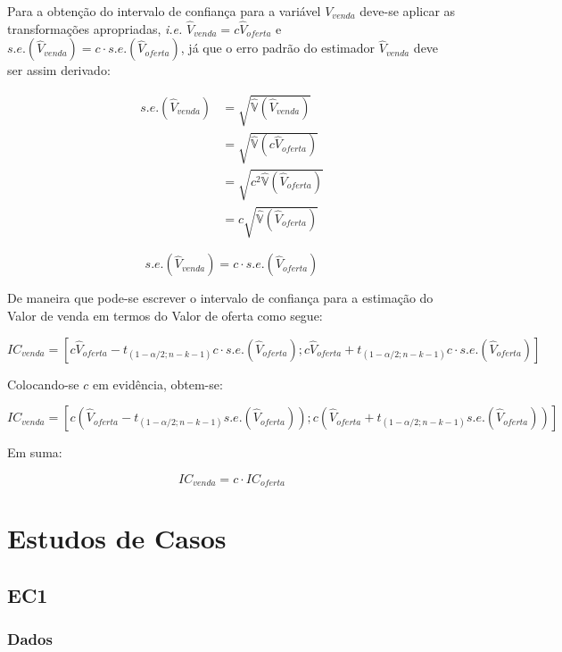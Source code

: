 \documentclass{article}
\begin{document}
Para a obtenção do intervalo de confiança para a variável \(V_{venda}\)
deve-se aplicar as transformações apropriadas, \emph{i.e.}
\(\hat V_{venda} = c \hat V_{oferta}\) e
\(s.e.(\hat V_{venda}) = c \cdot s.e.(\hat V_{oferta})\), já que o erro
padrão do estimador \(\hat V_{venda}\) deve ser assim derivado:

\begin{align*}
s.e.(\hat V_{venda}) &= \sqrt{\hat{\mathbb{V}}(\hat V_{venda})}\\
&= \sqrt{\hat{\mathbb{V}}(c \hat V_{oferta})} \\
&= \sqrt{c^2 \hat{\mathbb{V}}(\hat V_{oferta})}\\
&= c \sqrt{\hat{\mathbb{V}}(\hat V_{oferta})}
\end{align*}

\begin{equation}
\label{eq:SEVenda}
s.e.(\hat V_{venda}) = c \cdot s.e.(\hat V_{oferta})
\end{equation}

De maneira que pode-se escrever o intervalo de confiança para a
estimação do Valor de venda em termos do Valor de oferta como segue:

\[IC_{venda} = [c \hat V_{oferta} - t_{(1-\alpha/2; n-k-1)} c \cdot s.e.(\hat V_{oferta}); 
   c \hat V_{oferta} + t_{(1-\alpha/2; n-k-1)} c \cdot s.e.(\hat V_{oferta})]\]

Colocando-se \(c\) em evidência, obtem-se:

\[IC_{venda} = [c(\hat V_{oferta} - t_{(1-\alpha/2; n-k-1)} s.e.(\hat V_{oferta})); 
   c(\hat V_{oferta} + t_{(1-\alpha/2; n-k-1)} s.e.(\hat V_{oferta}))]\]

Em suma:

\begin{equation}
\label{eq:ICVendaOferta}
IC_{venda} = c \cdot IC_{oferta}
\end{equation}

\hypertarget{estudos-de-casos}{%
\section{Estudos de Casos}\label{estudos-de-casos}}

\hypertarget{ec1}{%
\subsection{EC1}\label{ec1}}

\hypertarget{dados}{%
\subsubsection{Dados}\label{dados}}
\end{document}

